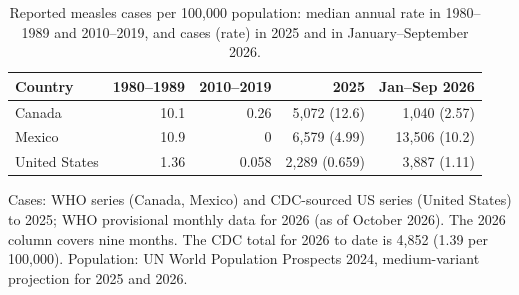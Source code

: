 \begin{table}[H]
\caption{Reported measles cases per 100,000 population: median annual rate in 1980--1989 and 2010--2019, and cases (rate) in 2025 and in January--September 2026.\label{tab:rates}}
\centering
\small
\begin{tabular}{lrrrr}
\toprule
\textbf{Country} & \textbf{1980--1989} & \textbf{2010--2019} & \textbf{2025} & \textbf{Jan--Sep 2026}\\
\midrule
Canada & 10.1 & 0.26 & 5,072 (12.6) & 1,040 (2.57)\\
Mexico & 10.9 & 0 & 6,579 (4.99) & 13,506 (10.2)\\
United States & 1.36 & 0.058 & 2,289 (0.659) & 3,887 (1.11)\\
\bottomrule
\end{tabular}
\par\smallskip
{\raggedright\footnotesize Cases: WHO series (Canada, Mexico) and CDC-sourced US series (United States) to 2025; WHO provisional monthly data for 2026 (as of October 2026). The 2026 column covers nine months. The CDC total for 2026 to date is 4,852 (1.39 per 100,000). Population: UN World Population Prospects 2024, medium-variant projection for 2025 and 2026.\par}
\end{table}
